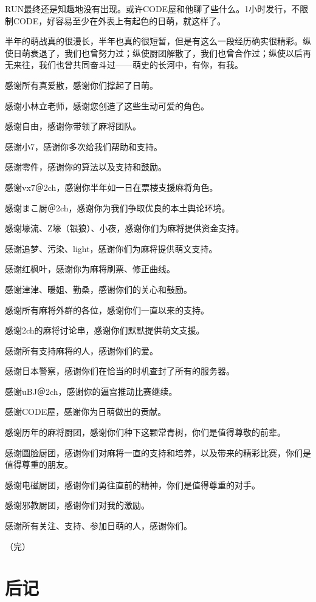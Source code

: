 RUN最终还是知趣地没有出现。或许CODE屋和他聊了些什么。1小时发行，不限制CODE，好容易至少在外表上有起色的日萌，就这样了。

半年的萌战真的很漫长，半年也真的很短暂，但是有这么一段经历确实很精彩。纵使日萌衰退了，我们也曾努力过；纵使厨团解散了，我们也曾合作过；纵使以后再无来往，我们也曾共同奋斗过——萌史的长河中，有你，有我。

感谢所有真爱散，感谢你们撑起了日萌。

感谢小林立老师，感谢您创造了这些生动可爱的角色。

感谢自由，感谢你带领了麻将团队。

感谢小7，感谢你多次给我们帮助和支持。

感谢零件，感谢你的算法以及支持和鼓励。

感谢vx7＠2ch，感谢你半年如一日在票楼支援麻将角色。

感谢まこ厨＠2ch，感谢你为我们争取优良的本土舆论环境。

感谢壕流、Z壕（银狼）、小夜，感谢你们为麻将提供资金支持。

感谢追梦、污染、light，感谢你们为麻将提供萌文支持。

感谢红枫叶，感谢你为麻将刷票、修正曲线。

感谢津津、暖姐、勤桑，感谢你们的关心和鼓励。

感谢所有麻将外群的各位，感谢你们一直以来的支持。

感谢2ch的麻将讨论串，感谢你们默默提供萌文支援。

感谢所有支持麻将的人，感谢你们的爱。

感谢日本警察，感谢你们在恰当的时机查封了所有的服务器。

感谢uBJ＠2ch，感谢你的逼宫推动比赛继续。

感谢CODE屋，感谢你为日萌做出的贡献。

感谢历年的麻将厨团，感谢你们种下这颗常青树，你们是值得尊敬的前辈。

感谢圆脸厨团，感谢你们对麻将一直的支持和培养，以及带来的精彩比赛，你们是值得尊重的朋友。

感谢电磁厨团，感谢你们勇往直前的精神，你们是值得尊重的对手。

感谢邪教厨团，感谢你们对我的激励。

感谢所有关注、支持、参加日萌的人，感谢你们。

（完）

\section*{后记}


